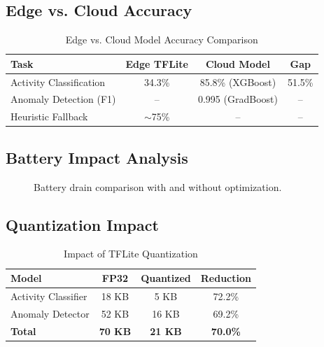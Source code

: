 \documentclass[conference]{IEEEtran}
\begin{document}
\subsection{Edge vs. Cloud Accuracy}

\begin{table}[H]
\centering
\caption{Edge vs. Cloud Model Accuracy Comparison}
\label{tab:edge_vs_cloud}
\begin{tabular}{lccc}
\toprule
\textbf{Task} & \textbf{Edge TFLite} & \textbf{Cloud Model} & \textbf{Gap} \\
\midrule
Activity Classification & 34.3\% & 85.8\% (XGBoost) & 51.5\% \\
Anomaly Detection (F1) & -- & 0.995 (GradBoost) & -- \\
Heuristic Fallback & $\sim$75\% & -- & -- \\
\bottomrule
\end{tabular}
\end{table}

\subsection{Battery Impact Analysis}

\begin{figure}[H]
\centering
{}
\caption{Battery drain comparison with and without optimization.}
\label{fig:battery}
\end{figure}

\subsection{Quantization Impact}

\begin{table}[H]
\centering
\caption{Impact of TFLite Quantization}
\label{tab:quantization}
\begin{tabular}{lccc}
\toprule
\textbf{Model} & \textbf{FP32} & \textbf{Quantized} & \textbf{Reduction} \\
\midrule
Activity Classifier & 18 KB & 5 KB & 72.2\% \\
Anomaly Detector & 52 KB & 16 KB & 69.2\% \\
\textbf{Total} & \textbf{70 KB} & \textbf{21 KB} & \textbf{70.0\%} \\
\bottomrule
\end{tabular}
\end{table}
\end{document}
